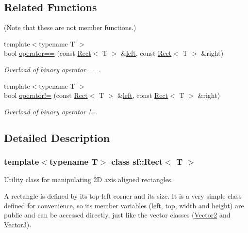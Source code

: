 \subsection*{Related Functions}
(Note that these are not member functions.) \begin{DoxyCompactItemize}
\item 
{\footnotesize template$<$typename T $>$ }\\bool \mbox{\hyperlink{classsf_1_1_rect_ab3488b5dbd0e587c4d7cb80605affc46}{operator==}} (const \mbox{\hyperlink{classsf_1_1_rect}{Rect}}$<$ T $>$ \&\mbox{\hyperlink{classsf_1_1_rect_aa49960fa465103d9cb7069ceb25c7c32}{left}}, const \mbox{\hyperlink{classsf_1_1_rect}{Rect}}$<$ T $>$ \&right)
\begin{DoxyCompactList}\small\item\em Overload of binary operator ==. \end{DoxyCompactList}\item 
{\footnotesize template$<$typename T $>$ }\\bool \mbox{\hyperlink{classsf_1_1_rect_a03fc4c105687b7d0f07b6b4ed4b45581}{operator!=}} (const \mbox{\hyperlink{classsf_1_1_rect}{Rect}}$<$ T $>$ \&\mbox{\hyperlink{classsf_1_1_rect_aa49960fa465103d9cb7069ceb25c7c32}{left}}, const \mbox{\hyperlink{classsf_1_1_rect}{Rect}}$<$ T $>$ \&right)
\begin{DoxyCompactList}\small\item\em Overload of binary operator !=. \end{DoxyCompactList}\end{DoxyCompactItemize}


\subsection{Detailed Description}
\subsubsection*{template$<$typename T$>$\newline
class sf\+::\+Rect$<$ T $>$}

Utility class for manipulating 2D axis aligned rectangles. 

\begin{DoxyVerb}\end{DoxyVerb}


A rectangle is defined by its top-\/left corner and its size. It is a very simple class defined for convenience, so its member variables (left, top, width and height) are public and can be accessed directly, just like the vector classes (\mbox{\hyperlink{classsf_1_1_vector2}{Vector2}} and \mbox{\hyperlink{classsf_1_1_vector3}{Vector3}}).

